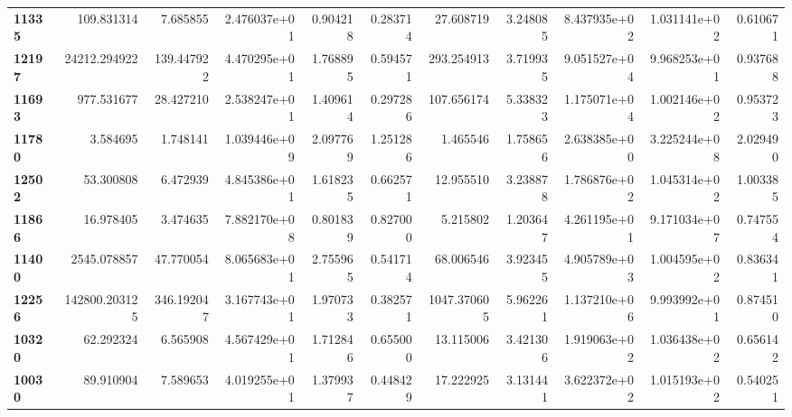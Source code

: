 \begin{table}[h]
\begin{tabular}{lrrrrrrrrrr}
\textbf{11335} &     109.831314 &        7.685855 &               2.476037e+01 &  0.904218 &  0.283714 &    27.608719 &   3.248085 &  8.437935e+02 &  1.031141e+02 &     0.610671 \\
\textbf{12197} &   24212.294922 &      139.447922 &               4.470295e+01 &  1.768895 &  0.594571 &   293.254913 &   3.719935 &  9.051527e+04 &  9.968253e+01 &     0.937688 \\
\textbf{11693} &     977.531677 &       28.427210 &               2.538247e+01 &  1.409614 &  0.297286 &   107.656174 &   5.338323 &  1.175071e+04 &  1.002146e+02 &     0.953723 \\
\textbf{11780} &       3.584695 &        1.748141 &               1.039446e+09 &  2.097769 &  1.251286 &     1.465546 &   1.758656 &  2.638385e+00 &  3.225244e+08 &     2.029490 \\
\textbf{12502} &      53.300808 &        6.472939 &               4.845386e+01 &  1.618235 &  0.662571 &    12.955510 &   3.238878 &  1.786876e+02 &  1.045314e+02 &     1.003385 \\
\textbf{11866} &      16.978405 &        3.474635 &               7.882170e+08 &  0.801839 &  0.827000 &     5.215802 &   1.203647 &  4.261195e+01 &  9.171034e+07 &     0.747554 \\
\textbf{11400} &    2545.078857 &       47.770054 &               8.065683e+01 &  2.755965 &  0.541714 &    68.006546 &   3.923455 &  4.905789e+03 &  1.004595e+02 &     0.836341 \\
\textbf{12256} &  142800.203125 &      346.192047 &               3.167743e+01 &  1.970733 &  0.382571 &  1047.370605 &   5.962261 &  1.137210e+06 &  9.993992e+01 &     0.874510 \\
\textbf{10320} &      62.292324 &        6.565908 &               4.567429e+01 &  1.712846 &  0.655000 &    13.115006 &   3.421306 &  1.919063e+02 &  1.036438e+02 &     0.656142 \\
\textbf{10030} &      89.910904 &        7.589653 &               4.019255e+01 &  1.379937 &  0.448429 &    17.222925 &   3.131441 &  3.622372e+02 &  1.015193e+02 &     0.540251 \\
\bottomrule
\end{tabular}
\end{table}
